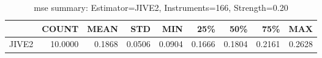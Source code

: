 \begin{table}[ht]
\centering
\caption{mse summary: Estimator=JIVE2, Instruments=166, Strength=0.20}
\begin{tabular}{lrrrrrrrr}
\toprule
 & COUNT & MEAN & STD & MIN & 25\% & 50\% & 75\% & MAX \\
\midrule
JIVE2 & 10.0000 & 0.1868 & 0.0506 & 0.0904 & 0.1666 & 0.1804 & 0.2161 & 0.2628 \\
\bottomrule
\end{tabular}
\end{table}
